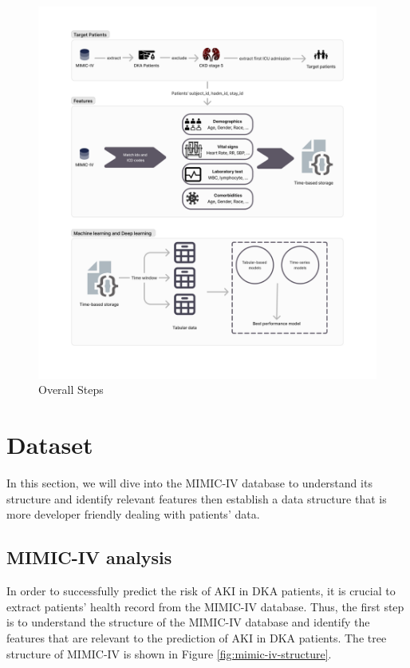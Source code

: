 \documentclass[../main.tex]{subfiles}
\begin{document}
\begin{figure}[h]
    \centering
    \includegraphics[width=\textwidth]{Figure/Overall steps.png}
    \caption{Overall Steps}
    \label{fig:overall-steps}
\end{figure}


\section{Dataset}

In this section, we will dive into the MIMIC-IV database to understand its structure and identify relevant features then establish a data structure that is more developer friendly dealing with patients' data.


\subsection{MIMIC-IV analysis}

In order to successfully predict the risk of AKI in DKA patients, it is crucial to extract patients' health record from the MIMIC-IV database.
Thus, the first step is to understand the structure of the MIMIC-IV database and identify the features that are relevant to the prediction of AKI in DKA patients.
The tree structure of MIMIC-IV is shown in Figure \ref{fig:mimic-iv-structure}.
\end{document}
